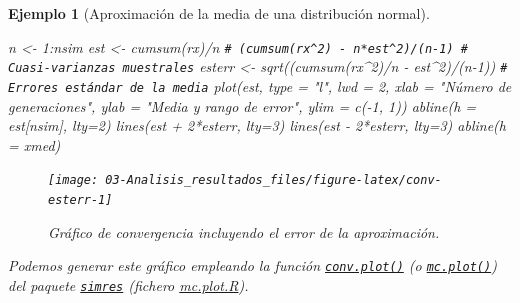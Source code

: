 \documentclass[
  10pt,
]{book}
\newenvironment{Shaded}{\begin{snugshade}}{\end{snugshade}}
\newcommand{\AttributeTok}[1]{\textcolor[rgb]{0.77,0.63,0.00}{#1}}
\newcommand{\CommentTok}[1]{\textcolor[rgb]{0.56,0.35,0.01}{\textit{#1}}}
\newcommand{\DecValTok}[1]{\textcolor[rgb]{0.00,0.00,0.81}{#1}}
\newcommand{\FunctionTok}[1]{\textcolor[rgb]{0.00,0.00,0.00}{#1}}
\newcommand{\NormalTok}[1]{#1}
\newcommand{\OtherTok}[1]{\textcolor[rgb]{0.56,0.35,0.01}{#1}}
\newcommand{\SpecialCharTok}[1]{\textcolor[rgb]{0.00,0.00,0.00}{#1}}
\newcommand{\StringTok}[1]{\textcolor[rgb]{0.31,0.60,0.02}{#1}}
\theoremstyle{break}
\newtheorem{example}{Ejemplo}[chapter]
\theoremstyle{nonumberplain}
\renewcommand{\CommentTok}[1]{\textcolor[rgb]{0.41,0.41,0.41}{\texttt{#1}}}
\begin{document}
\begin{example}[Aproximación de la media de una distribución normal]
\begin{Shaded}
\begin{Highlighting}[]
\NormalTok{n }\OtherTok{\textless{}{-}} \DecValTok{1}\SpecialCharTok{:}\NormalTok{nsim}
\NormalTok{est }\OtherTok{\textless{}{-}} \FunctionTok{cumsum}\NormalTok{(rx)}\SpecialCharTok{/}\NormalTok{n}
\CommentTok{\# (cumsum(rx\^{}2) {-} n*est\^{}2)/(n{-}1) \# Cuasi{-}varianzas muestrales}
\NormalTok{esterr }\OtherTok{\textless{}{-}} \FunctionTok{sqrt}\NormalTok{((}\FunctionTok{cumsum}\NormalTok{(rx}\SpecialCharTok{\^{}}\DecValTok{2}\NormalTok{)}\SpecialCharTok{/}\NormalTok{n }\SpecialCharTok{{-}}\NormalTok{ est}\SpecialCharTok{\^{}}\DecValTok{2}\NormalTok{)}\SpecialCharTok{/}\NormalTok{(n}\DecValTok{{-}1}\NormalTok{)) }\CommentTok{\# Errores estándar de la media}
\FunctionTok{plot}\NormalTok{(est, }\AttributeTok{type =} \StringTok{"l"}\NormalTok{, }\AttributeTok{lwd =} \DecValTok{2}\NormalTok{, }\AttributeTok{xlab =} \StringTok{"Número de generaciones"}\NormalTok{, }
     \AttributeTok{ylab =} \StringTok{"Media y rango de error"}\NormalTok{, }\AttributeTok{ylim =} \FunctionTok{c}\NormalTok{(}\SpecialCharTok{{-}}\DecValTok{1}\NormalTok{, }\DecValTok{1}\NormalTok{))}
\FunctionTok{abline}\NormalTok{(}\AttributeTok{h =}\NormalTok{ est[nsim], }\AttributeTok{lty=}\DecValTok{2}\NormalTok{)}
\FunctionTok{lines}\NormalTok{(est }\SpecialCharTok{+} \DecValTok{2}\SpecialCharTok{*}\NormalTok{esterr, }\AttributeTok{lty=}\DecValTok{3}\NormalTok{)}
\FunctionTok{lines}\NormalTok{(est }\SpecialCharTok{{-}} \DecValTok{2}\SpecialCharTok{*}\NormalTok{esterr, }\AttributeTok{lty=}\DecValTok{3}\NormalTok{)}
\FunctionTok{abline}\NormalTok{(}\AttributeTok{h =}\NormalTok{ xmed)}
\end{Highlighting}
\end{Shaded}

\begin{figure}[!htbp]

{\centering \texttt{[image: 03-Analisis\_resultados\_files/figure-latex/conv-esterr-1]} 

}

\caption{Gráfico de convergencia incluyendo el error de la aproximación.}\label{fig:conv-esterr}
\end{figure}

Podemos generar este gráfico empleando la función \href{https://rubenfcasal.github.io/simres/reference/mc.plot.html}{\texttt{conv.plot()}} (o \href{https://rubenfcasal.github.io/simres/reference/mc.plot.html}{\texttt{mc.plot()}}) del paquete \href{https://rubenfcasal.github.io/simres}{\texttt{simres}} (fichero \href{R/mc.plot.R}{\emph{mc.plot.R}}).
\end{example}
\end{document}

